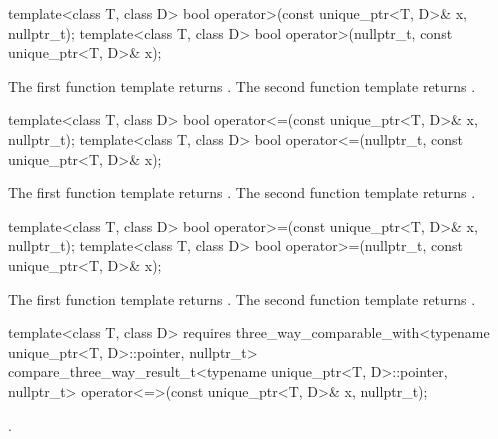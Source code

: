 %
\begin{itemdecl}
template<class T, class D>
  bool operator>(const unique_ptr<T, D>& x, nullptr_t);
template<class T, class D>
  bool operator>(nullptr_t, const unique_ptr<T, D>& x);
\end{itemdecl}

\begin{itemdescr}
\pnum
\returns
The first function template returns .
The second function template returns .
\end{itemdescr}

%
\begin{itemdecl}
template<class T, class D>
  bool operator<=(const unique_ptr<T, D>& x, nullptr_t);
template<class T, class D>
  bool operator<=(nullptr_t, const unique_ptr<T, D>& x);
\end{itemdecl}

\begin{itemdescr}
\pnum
\returns
The first function template returns .
The second function template returns .
\end{itemdescr}

%
\begin{itemdecl}
template<class T, class D>
  bool operator>=(const unique_ptr<T, D>& x, nullptr_t);
template<class T, class D>
  bool operator>=(nullptr_t, const unique_ptr<T, D>& x);
\end{itemdecl}

\begin{itemdescr}
\pnum
\returns
The first function template returns .
The second function template returns .
\end{itemdescr}

%
\begin{itemdecl}
template<class T, class D>
  requires three_way_comparable_with<typename unique_ptr<T, D>::pointer, nullptr_t>
  compare_three_way_result_t<typename unique_ptr<T, D>::pointer, nullptr_t>
    operator<=>(const unique_ptr<T, D>& x, nullptr_t);
\end{itemdecl}

\begin{itemdescr}
\pnum
\returns
{}.
\end{itemdescr}

